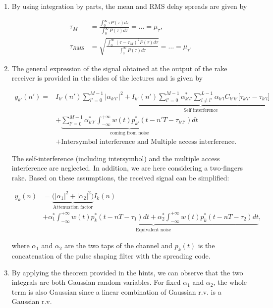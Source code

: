 \documentclass [a4paper, 11pt] {article}
\begin{document}
    \begin{solution}
        \begin{enumerate}
    \item By using integration by parts, the mean and RMS delay spreads are given by

\begin{align}
        \tau_M &= \frac{\int_0^\infty \tau P(\tau) d\tau}{\int_0^\infty P(\tau) d\tau} = \hdots = \mu_{\tau}, \\
        \tau_{RMS} & = \sqrt{\frac{\int_0^\infty (\tau - \tau_M)^2 P(\tau) d\tau}{\int_0^\infty P(\tau) d\tau}} = \hdots = \mu_{\tau}.
\end{align}

\item The general expression of the signal obtained at the output of the rake receiver is provided in the slides of the lectures and is given by

\begin{align}
    y_{k'}(n') =& I_{k'}(n') \sum_{l'=0}^{M-1}|\alpha_{k'l'}|^2 +  \underbrace{I_{k'}(n')\sum_{l'=0}^{M-1}\alpha^*_{k'l'}\sum_{l\neq l'}^{L-1}\alpha_{k'l}C_{k'k'}\big[\tau_{k'l'}-\tau_{k'l} \big]}_{\text{Self interference}}\\
    &+ \underbrace{\sum_{l'=0}^{M-1} \alpha^*_{k'l'} \int_{-\infty}^{+\infty}w(t)p^*_{k'}(t-n'T-\tau_{k'l'})dt}_{\text{coming from noise}}\nonumber\\
    &+ \text{Intersymbol interference and Multiple access interference}. \nonumber
\end{align}

The self-interference (including intersymbol) and the multiple access interference are neglected. In addition, we are here considering a two-fingers rake. Based on these assumptions, the received signal can be simplified:

\begin{align}
    y_k(n) &= \underbrace{\Big(|\alpha_1|^2 + |\alpha_2|^2 \Big)}_{\text{Attenuation factor}} I_k(n)\\
    &+ \underbrace{\alpha^*_1 \int_{-\infty}^{+\infty} w(t)p_k^*(t-nT-\tau_{1})dt + \alpha^*_2 \int_{-\infty}^{+\infty} w(t)p_k^*(t-nT-\tau_{2})dt}_{\text{Equivalent noise}}, \nonumber
\end{align}

where $\alpha_1$ and $\alpha_2$ are the two taps of the channel and $p_k(t)$ is the concatenation of the pulse shaping filter with the spreading code.

\item By applying the theorem provided in the hints, we can observe that the two integrals are both Gaussian random variables. For fixed $\alpha_1$ and $\alpha_2$, the whole term is also Gaussian since a linear combination of Gaussian r.v. is a Gaussian r.v.


\end{enumerate}
\end{solution}
\end{document}
